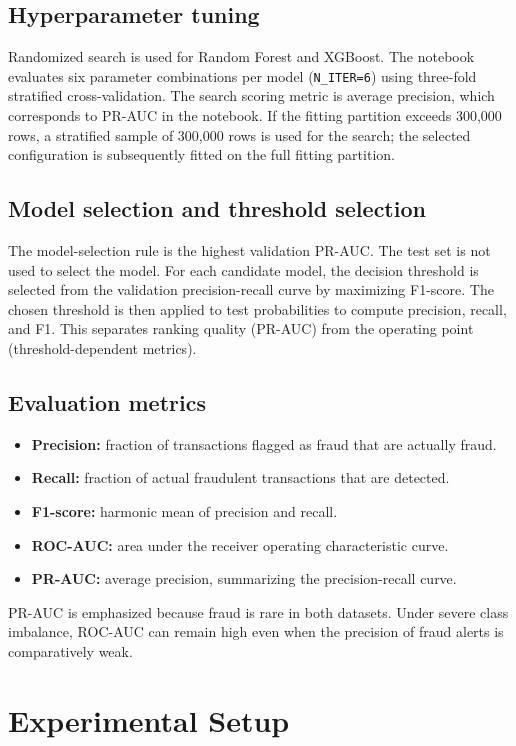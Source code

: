 \documentclass[12pt,a4paper]{report}
\begin{document}
\section{Hyperparameter tuning}
Randomized search is used for Random Forest and XGBoost. The notebook evaluates six parameter combinations per model (\texttt{N\_ITER=6}) using three-fold stratified cross-validation. The search scoring metric is average precision, which corresponds to PR-AUC in the notebook. If the fitting partition exceeds 300,000 rows, a stratified sample of 300,000 rows is used for the search; the selected configuration is subsequently fitted on the full fitting partition.

\section{Model selection and threshold selection}
The model-selection rule is the highest validation PR-AUC. The test set is not used to select the model. For each candidate model, the decision threshold is selected from the validation precision-recall curve by maximizing F1-score. The chosen threshold is then applied to test probabilities to compute precision, recall, and F1. This separates ranking quality (PR-AUC) from the operating point (threshold-dependent metrics).

\section{Evaluation metrics}
\begin{itemize}
  \item \textbf{Precision:} fraction of transactions flagged as fraud that are actually fraud.
  \item \textbf{Recall:} fraction of actual fraudulent transactions that are detected.
  \item \textbf{F1-score:} harmonic mean of precision and recall.
  \item \textbf{ROC-AUC:} area under the receiver operating characteristic curve.
  \item \textbf{PR-AUC:} average precision, summarizing the precision-recall curve.
\end{itemize}
PR-AUC is emphasized because fraud is rare in both datasets. Under severe class imbalance, ROC-AUC can remain high even when the precision of fraud alerts is comparatively weak.

\chapter{Experimental Setup}
\end{document}
